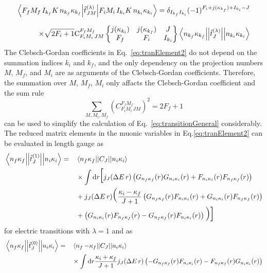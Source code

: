 \begin{alignat}{2}
\left<F_fM_f\,I_{k_f}K\,n_{k_f}\kappa_{k_f} \middle|\hat{t}^{(\lambda)}_{JM}\middle|F_iM_i\,I_{k_i}K\,n_{k_i}\kappa_{k_i}\right>=\delta_{I_{k_f}I_{k_i}}(-1)^{F_i+j(\kappa_{k_f})+I_{k_i}-J}
\notag\\[7.5pt]
\times\sqrt{2F_i+1}\text{C}^{F_fM_f}_{F_iM_i\,JM}
\begin{Bmatrix}
j(\kappa_{k_i})&j(\kappa_{k_f})&J\\
F_f&F_i&I_{k_i}
\end{Bmatrix}
\left< n_{k_f}\kappa_{k_f}\middle|\middle|\hat{t}^{(\lambda)}_{J}\middle|\middle|n_{k_i}\kappa_{k_i}\right>
\label{eq:tranElement2}
\end{alignat}
The Clebsch-Gordan coefficients in Eq.~\eqref{eq:tranElement2} do not depend on the summation indices $k_i$ and $k_f$, and the only dependency on the projection numbers $M$, $M_f$, and $M_i$ are as arguments of the Clebsch-Gordan coefficients. Therefore, the summation over $M$, $M_f$, $M_i$ only affacts the Clebsch-Gordan coefficient and the sum rule~\cite{varshalovich1988}
\begin{equation}
\sum_{M,M_i,M_f}\left(C^{F_fM_f}_{F_iM_i\,JM}\right)^2 = 2F_f+1
\end{equation}
can be used to simplify the calculation of Eq.~\eqref{eq:transitionGeneral} considerably. The reduced matrix elements in the muonic variables in Eq.\eqref{eq:tranElement2} can be evaluated in length gauge as~\cite{johnson2007}
\begin{alignat}{2}
\label{eq:relElTrans}
&\left< n_{f}\kappa_{f}\middle|\middle|\hat{t}^{(1)}_{J}\middle|\middle|n_{i}\kappa_{i}\right>=&&
\left<n_f\kappa_f\middle|\middle|C_J\middle|\middle|n_i\kappa_i\right>\\
&&&\times\int\text{d}r \text{\huge[}j_J(\Delta E\,r)\left(G_{n_f\kappa_f}(r)G_{n_i\kappa_i}(r)+F_{n_i\kappa_i}(r)F_{n_f\kappa_f}(r)\right)\\
&&& +j_J(\Delta E\,r)\text{\huge(}\frac{\kappa_i-\kappa_f}{J+1}
\left(G_{n_f\kappa_f}(r)F_{n_i\kappa_i}(r)+G_{n_i\kappa_i}(r)F_{n_f\kappa_f}(r)\right)\\
&&& +\left(G_{n_i\kappa_i}(r)F_{n_f\kappa_f}(r)-G_{n_f\kappa_f}(r)F_{n_i\kappa_i}(r)\right)
 \text{\huge)}\text{\huge]}
\end{alignat}
for electric transitions with $\lambda= 1 $ and as
\begin{alignat}{2}
&\left< n_{f}\kappa_{f}\middle|\middle|\hat{t}^{(0)}_{J}\middle|\middle|n_{i}\kappa_{i}\right>=&&
\left<n_f\,{-}{\kappa_f}\middle|\middle|C_J\middle|\middle|n_i\kappa_i\right>\notag\\
&&&\times\int\text{d}r\frac{\kappa_i+\kappa_f}{J+1}j_J(\Delta E\,r)\left(-G_{n_f\kappa_f}(r)F_{n_i\kappa_i}(r)-F_{n_f\kappa_f}(r)G_{n_i\kappa_i}(r)\right)
\end{alignat}
